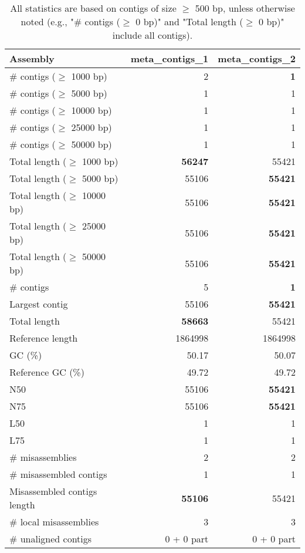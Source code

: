 \documentclass[12pt,a4paper]{article}
\begin{document}
\begin{table}[ht]
\begin{center}
\caption{All statistics are based on contigs of size $\geq$ 500 bp, unless otherwise noted (e.g., "\# contigs ($\geq$ 0 bp)" and "Total length ($\geq$ 0 bp)" include all contigs).}
\begin{tabular}{|l*{2}{|r}|}
\hline
Assembly & meta\_contigs\_1 & meta\_contigs\_2 \\ \hline
\# contigs ($\geq$ 1000 bp) & 2 & {\bf 1} \\ \hline
\# contigs ($\geq$ 5000 bp) & 1 & 1 \\ \hline
\# contigs ($\geq$ 10000 bp) & 1 & 1 \\ \hline
\# contigs ($\geq$ 25000 bp) & 1 & 1 \\ \hline
\# contigs ($\geq$ 50000 bp) & 1 & 1 \\ \hline
Total length ($\geq$ 1000 bp) & {\bf 56247} & 55421 \\ \hline
Total length ($\geq$ 5000 bp) & 55106 & {\bf 55421} \\ \hline
Total length ($\geq$ 10000 bp) & 55106 & {\bf 55421} \\ \hline
Total length ($\geq$ 25000 bp) & 55106 & {\bf 55421} \\ \hline
Total length ($\geq$ 50000 bp) & 55106 & {\bf 55421} \\ \hline
\# contigs & 5 & {\bf 1} \\ \hline
Largest contig & 55106 & {\bf 55421} \\ \hline
Total length & {\bf 58663} & 55421 \\ \hline
Reference length & 1864998 & 1864998 \\ \hline
GC (\%) & 50.17 & 50.07 \\ \hline
Reference GC (\%) & 49.72 & 49.72 \\ \hline
N50 & 55106 & {\bf 55421} \\ \hline
N75 & 55106 & {\bf 55421} \\ \hline
L50 & 1 & 1 \\ \hline
L75 & 1 & 1 \\ \hline
\# misassemblies & 2 & 2 \\ \hline
\# misassembled contigs & 1 & 1 \\ \hline
Misassembled contigs length & {\bf 55106} & 55421 \\ \hline
\# local misassemblies & 3 & 3 \\ \hline
\# unaligned contigs & 0 + 0 part & 0 + 0 part \\ \hline

\end{tabular}
\end{center}
\end{table}
\end{document}
